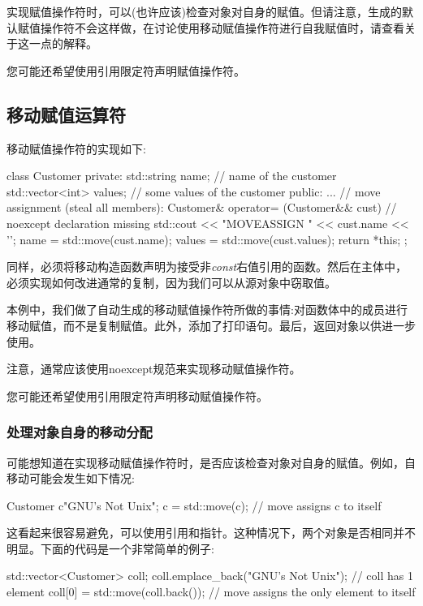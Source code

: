 实现赋值操作符时，可以(也许应该)检查对象对自身的赋值。但请注意，生成的默认赋值操作符不会这样做，在讨论使用移动赋值操作符进行自我赋值时，请查看关于这一点的解释。

您可能还希望使用引用限定符声明赋值操作符。

\subsection{移动赋值运算符}

移动赋值操作符的实现如下:

\begin{cppcode}
class Customer {
	private:
	std::string name; // name of the customer
	std::vector<int> values; // some values of the customer
	public:
	...
	// move assignment (steal all members):
	Customer& operator= (Customer&& cust) { // noexcept declaration missing
		std::cout << "MOVEASSIGN " << cust.name << '\n';
		name = std::move(cust.name);
		values = std::move(cust.values);
		return *this;
	}
};
\end{cppcode}

同样，必须将移动构造函数声明为接受非\textit{const}右值引用的函数。然后在主体中，必须实现如何改进通常的复制，因为我们可以从源对象中窃取值。

本例中，我们做了自动生成的移动赋值操作符所做的事情:对函数体中的成员进行移动赋值，而不是复制赋值。此外，添加了打印语句。最后，返回对象以供进一步使用。

注意，通常应该使用noexcept规范来实现移动赋值操作符。

您可能还希望使用引用限定符声明移动赋值操作符。

\subsubsection{处理对象自身的移动分配}

可能想知道在实现移动赋值操作符时，是否应该检查对象对自身的赋值。例如，自移动可能会发生如下情况:

\begin{cppcode}
Customer c{"GNU's Not Unix"};
c = std::move(c); // move assigns c to itself
\end{cppcode}

这看起来很容易避免，可以使用引用和指针。这种情况下，两个对象是否相同并不明显。下面的代码是一个非常简单的例子:

\begin{cppcode}
std::vector<Customer> coll;
coll.emplace_back("GNU's Not Unix"); // coll has 1 element
coll[0] = std::move(coll.back()); // move assigns the only element to itself
\end{cppcode}

